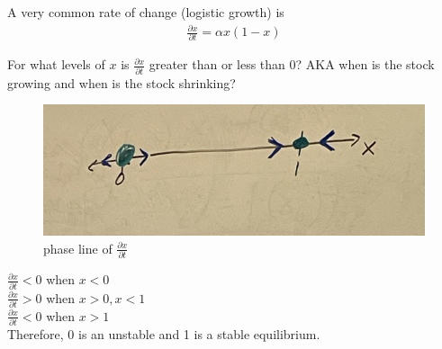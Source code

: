 \documentclass{article}
\begin{document}
A very common rate of change (logistic growth) is
\begin{align*}
    \frac{\partial x}{\partial t} = \alpha x (1 - x) 
\end{align*}

For what levels of $x$ is $\frac{\partial x}{\partial t}$ greater than or less than 0? AKA when is the stock growing and when is the stock shrinking? 

\begin{figure}[htp]
    \centering
    \includegraphics[width=0.5\linewidth]{Screen Shot 2023-11-13 at 11.52.17 AM.png}
    \caption{phase line of $\frac{\partial x}{\partial t}$}
\end{figure}

$\frac{\partial x}{\partial t} < 0$ when $x < 0$ \\
$\frac{\partial x}{\partial t} > 0$ when $x > 0, x < 1$ \\
$\frac{\partial x}{\partial t} < 0$ when $x > 1$ \\

Therefore, 0 is an unstable   and 1 is a stable equilibrium. 
\end{document}
